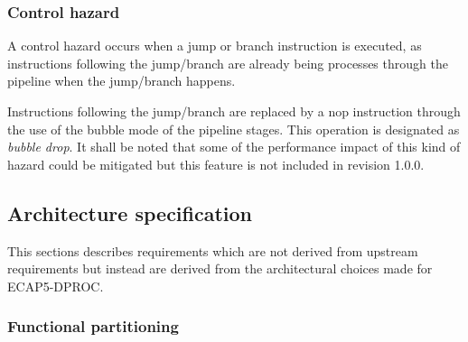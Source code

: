     \subsubsection{Control hazard}

      \label{control-hazard}

      \begin{content}
          A control hazard occurs when a jump or branch instruction is executed, as instructions following the jump/branch are already being processes through the pipeline when the jump/branch happens.

          Instructions following the jump/branch are replaced by a nop instruction through the use of the bubble mode of the pipeline stages. This operation is designated as \textit{bubble drop}. It shall be noted that some of the performance impact of this kind of hazard could be mitigated but this feature is not included in revision 1.0.0.
        \end{content}

  \subsection{Architecture specification}

    \begin{content}
        This sections describes requirements which are not derived from upstream requirements but instead are derived from the architectural choices made for ECAP5-DPROC.
      \end{content}

    \subsubsection{Functional partitioning}






